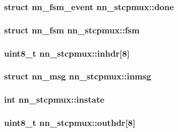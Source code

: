 \subsubsection[{done}]{\setlength{\rightskip}{0pt plus 5cm}struct {\bf nn\+\_\+fsm\+\_\+event} nn\+\_\+stcpmux\+::done}\hypertarget{structnn__stcpmux_a94cb62c326bafd2a2ec1b976bade82bf}{}\label{structnn__stcpmux_a94cb62c326bafd2a2ec1b976bade82bf}
\subsubsection[{fsm}]{\setlength{\rightskip}{0pt plus 5cm}struct {\bf nn\+\_\+fsm} nn\+\_\+stcpmux\+::fsm}\hypertarget{structnn__stcpmux_a13e11d3e9ff4638309d71ed95befdf26}{}\label{structnn__stcpmux_a13e11d3e9ff4638309d71ed95befdf26}
\subsubsection[{inhdr}]{\setlength{\rightskip}{0pt plus 5cm}uint8\+\_\+t nn\+\_\+stcpmux\+::inhdr\mbox{[}8\mbox{]}}\hypertarget{structnn__stcpmux_adf8c5aea3a5ca44c20885ce04ffacf66}{}\label{structnn__stcpmux_adf8c5aea3a5ca44c20885ce04ffacf66}
\subsubsection[{inmsg}]{\setlength{\rightskip}{0pt plus 5cm}struct {\bf nn\+\_\+msg} nn\+\_\+stcpmux\+::inmsg}\hypertarget{structnn__stcpmux_a98637f2983a1e14916a0c996af8e81ff}{}\label{structnn__stcpmux_a98637f2983a1e14916a0c996af8e81ff}
\subsubsection[{instate}]{\setlength{\rightskip}{0pt plus 5cm}int nn\+\_\+stcpmux\+::instate}\hypertarget{structnn__stcpmux_ad8501b9f80ac93856fa96c897bcab634}{}\label{structnn__stcpmux_ad8501b9f80ac93856fa96c897bcab634}
\subsubsection[{outhdr}]{\setlength{\rightskip}{0pt plus 5cm}uint8\+\_\+t nn\+\_\+stcpmux\+::outhdr\mbox{[}8\mbox{]}}\hypertarget{structnn__stcpmux_af2f02c5703dfec8d66124c4990061186}{}\label{structnn__stcpmux_af2f02c5703dfec8d66124c4990061186}

